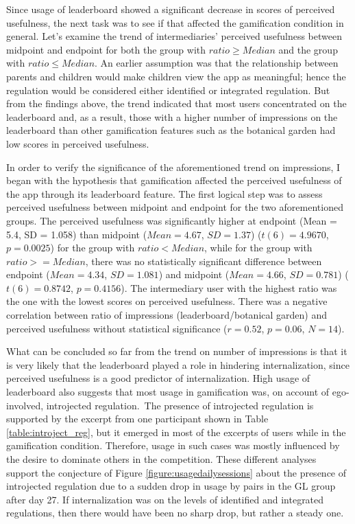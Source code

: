 Since usage of leaderboard showed a significant decrease in scores of perceived usefulness, the next task was to see if that affected the gamification condition in general. Let's examine the trend of intermediaries' perceived usefulness between midpoint and endpoint for both the group with $ratio \geq Median$ and the group with $ratio \leq Median$. An earlier assumption was that the relationship between parents and children would make children view the app as meaningful; hence the regulation would be considered either identified or integrated regulation. But from the findings above, the trend indicated that most users concentrated on the leaderboard and, as a result, those with a higher number of impressions on the leaderboard than other gamification features such as the botanical garden had low scores in perceived usefulness.

In order to verify the significance of the aforementioned trend on impressions, I began with the hypothesis that gamification affected the perceived usefulness of the app through its leaderboard feature.  The first logical step was to assess perceived usefulness between midpoint and endpoint for the two aforementioned groups. The perceived usefulness was significantly higher at endpoint (Mean = 5.4, SD = 1.058) than midpoint ($Mean=4.67$, $SD=1.37$) ($t(6)=4.9670$, $p=0.0025$) for the group with $ratio<Median$, while for the group with $ratio>=Median$, there was no statistically significant difference between endpoint ($Mean=4.34$, $SD=1.081$) and midpoint ($Mean=4.66$, $SD=0.781$) ($t(6)=0.8742$, $p= 0.4156$). The intermediary user with the highest ratio was the one with the lowest scores on perceived usefulness. There was a negative correlation between ratio of impressions (leaderboard/botanical garden) and perceived usefulness without statistical significance ($r=0.52$, $p=0.06$, $N=14$).

What can be concluded so far from the trend on number of impressions is that it is very likely that the leaderboard played a role in hindering internalization, since perceived usefulness is a good predictor of internalization. High usage of leaderboard also suggests that most usage in gamification was, on account of ego-involved, introjected regulation.~The presence of introjected regulation is supported by the excerpt from one participant shown in Table \ref{table:introject_reg}, but it emerged in most of the excerpts of users while in the gamification condition. Therefore, usage in such cases was mostly influenced by the desire to dominate others in the competition. These different analyses support the conjecture of Figure \ref{figure:usagedailysessions} about the presence of introjected regulation due to a sudden drop in usage by pairs in the GL group  after day 27. If internalization was on the levels of identified and integrated regulations, then there would have been no sharp drop, but rather a steady one.  

